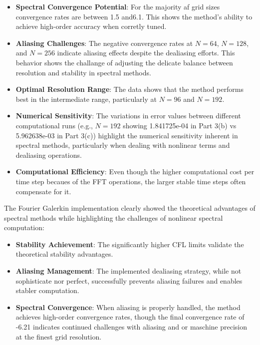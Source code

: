 \begin{itemize}
	\item \textbf{Spectral Convergence Potential}: For the majority af grid sizes convergence rates are between 1.5 and6.1. This shows the method's ability to achieve high-order accuracy when corretly tuned.
	\item \textbf{Aliasing Challenges}: The negative convergence rates at $N=64$, $N=128$, and $N=256$ indicate  aliasing effects despite the dealiasing efforts. This behavior shows the challange of adjusting the delicate balance between resolution and stability in spectral methods.
	\item \textbf{Optimal Resolution Range}: The data shows that the method performs best in the intermediate range, particularly at $N=96$ and $N=192$. 
	\item \textbf{Numerical Sensitivity}: The variations in error values between different computational runs (e.g., $N=192$ showing 1.841725e-04 in Part 3(b) vs 5.962638e-03 in Part 3(c)) highlight the numerical sensitivity inherent in spectral methods, particularly when dealing with nonlinear terms and dealiasing operations.
	\item \textbf{Computational Efficiency}: Even though the higher computational cost per time step becaues of the FFT operations, the larger stable time steps often compensate for it.
\end{itemize}
The Fourier Galerkin implementation clearly showed the theoretical advantages of spectral methods while highlighting the challenges of nonlinear spectral computation:
\begin{itemize}
	\item \textbf{Stability Achievement}: The significantly higher CFL limits validate the theoretical stability advantages.
	\item \textbf{Aliasing Management}: The implemented dealiasing strategy, while not sophisticate nor perfect, successfully prevents aliasing failures and enables stabler computation.
	\item \textbf{Spectral Convergence}: When aliasing is properly handled, the method achieves high-order convergence rates, though the final convergence rate of -6.21 indicates continued challenges with aliasing and or maschine precision at the finest grid resolution.
\end{itemize}
%
